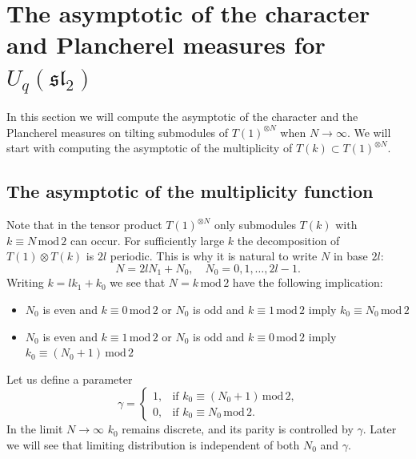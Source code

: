 \documentclass[11pt]{amsart}
\newcommand\lie[1]{\mathfrak{#1}}
\begin{document}
\section{The asymptotic of the character and Plancherel measures for $U_q(\lie{sl}_2)$}\label{as9}
In this section we will compute the asymptotic of the character and the Plancherel measures on tilting submodules of $T(1)^{\otimes N}$ when $N\to \infty$. We will start with computing the asymptotic of the multiplicity of $T(k)\subset T(1)^{\otimes N}$.
\subsection{The asymptotic of the multiplicity function}
Note that in the tensor product $T(1)^{\otimes N}$ only submodules $T(k)$ with $k\equiv N \,\mathrm{mod}\,2$ can occur. For sufficiently large $k$ the decomposition of $T(1)\otimes T(k)$ is $2l$ periodic. This is why it is natural to write $N$ in base $2l$:
$$
N=2lN_1+N_0,\quad N_0=0,1,\ldots,2l-1.
$$
Writing $k=lk_1+k_0$ we see that $N=k\,\mathrm{mod}\,2$ have the following implication:
\begin{itemize}
    \item $N_0$ is even and $k\equiv 0\,\mathrm{mod}\,2$ or $N_0$ is odd and $k\equiv 1\,\mathrm{mod}\,2$ imply $k_0\equiv N_0\,\mathrm{mod}\,2$
    \item $N_0$ is even and $k\equiv 1\,\mathrm{mod}\,2$ or $N_0$ is odd and $k\equiv 0\,\mathrm{mod}\,2$ imply $k_0\equiv (N_0+1)\,\mathrm{mod}\,2$
\end{itemize}
Let us define a parameter
$$
\gamma=
\begin{cases}
1,&\text{if $k_0\equiv (N_0+1)\,\mathrm{mod}\,2$,}\\
0,&\text{if $k_0\equiv N_0\,\mathrm{mod}\,2$.}
\end{cases}
$$
In the limit $N\to\infty$ $k_0$ remains discrete, and its parity is controlled by $\gamma$. Later we will see that limiting distribution is independent of both $N_0$ and $\gamma$.
\end{document}
